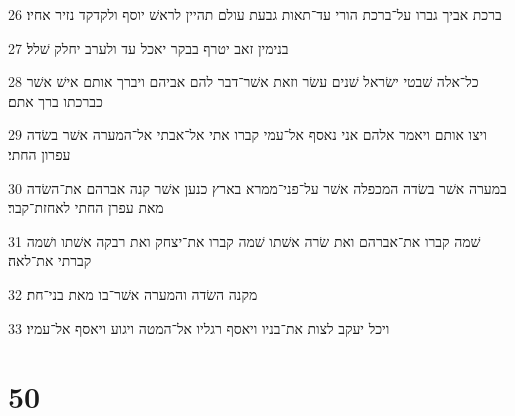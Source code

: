 \par 26 ברכת אביך גברו על־ברכת הורי עד־תאות גבעת עולם תהיין לראשׁ יוסף ולקדקד נזיר אחיו׃
\par 27 בנימין זאב יטרף בבקר יאכל עד ולערב יחלק שׁלל׃
\par 28 כל־אלה שׁבטי ישׂראל שׁנים עשׂר וזאת אשׁר־דבר להם אביהם ויברך אותם אישׁ אשׁר כברכתו ברך אתם׃
\par 29 ויצו אותם ויאמר אלהם אני נאסף אל־עמי קברו אתי אל־אבתי אל־המערה אשׁר בשׂדה עפרון החתי׃
\par 30 במערה אשׁר בשׂדה המכפלה אשׁר על־פני־ממרא בארץ כנען אשׁר קנה אברהם את־השׂדה מאת עפרן החתי לאחזת־קבר׃
\par 31 שׁמה קברו את־אברהם ואת שׂרה אשׁתו שׁמה קברו את־יצחק ואת רבקה אשׁתו ושׁמה קברתי את־לאה׃
\par 32 מקנה השׂדה והמערה אשׁר־בו מאת בני־חת׃
\par 33 ויכל יעקב לצות את־בניו ויאסף רגליו אל־המטה ויגוע ויאסף אל־עמיו׃

\chapter{50}

